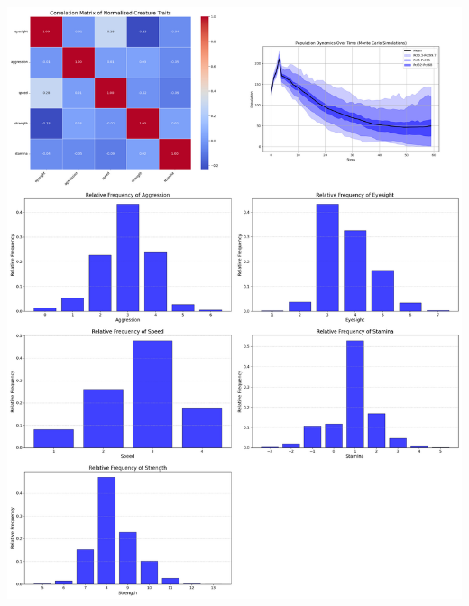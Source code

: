 \documentclass{article}
\begin{document}
\begin{center}
    \includegraphics[scale=0.21]{tests/1.5.jpg}
\end{center}
\end{document}
